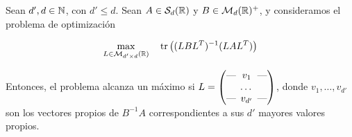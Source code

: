 \begin{thm} \label{thm:eigen_trace_ratio_opt}
    Sean $d',d \in \mathbb{N} $, con $d' \le d$. Sean $A \in \mathcal{S}_d(\mathbb{R})$ y $B \in \mathcal{M}_d(\mathbb{R})^+$, y consideramos el problema de optimización
    
    \begin{equation} \label{eq:eigen_trace_ratio_opt}
    \max_{L \in \mathcal{M}_{d'\times d}(\mathbb{R})} \quad \operatorname{tr}\left((LBL^T)^{-1}(LAL^T)\right)
    \end{equation}
    
    Entonces, el problema alcanza un máximo si $L = \begin{pmatrix}
    \text{---} \hspace{-0.2cm} & v_1 & \hspace{-0.2cm} \text{---} \\
    & \dots &  \\
    \text{---} \hspace{-0.2cm} & v_{d'} & \hspace{-0.2cm} \text{---}
    \end{pmatrix}$, donde $v_1,\dots,v_{d'}$ son los vectores propios de $B^{-1}A$ correspondientes a sus $d'$ mayores valores propios.
\end{thm}

